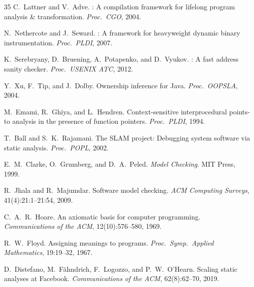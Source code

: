 \documentclass[11pt,a4paper]{article}
\begin{document}
\begin{thebibliography}{35}
C.~Lattner and V.~Adve.
: A compilation framework for lifelong program analysis \& transformation.
\newblock \emph{Proc.\ CGO}, 2004.

N.~Nethercote and J.~Seward.
: A framework for heavyweight dynamic binary instrumentation.
\newblock \emph{Proc.\ PLDI}, 2007.

K.~Serebryany, D.~Bruening, A.~Potapenko, and D.~Vyukov.
: A fast address sanity checker.
\newblock \emph{Proc.\ USENIX ATC}, 2012.

Y.~Xu, F.~Tip, and J.~Dolby.
\newblock Ownership inference for {Java}.
\newblock \emph{Proc.\ OOPSLA}, 2004.

M.~Emami, R.~Ghiya, and L.~Hendren.
\newblock Context-sensitive interprocedural points-to analysis in the presence of function pointers.
\newblock \emph{Proc.\ PLDI}, 1994.

T.~Ball and S.~K.~Rajamani.
\newblock The {SLAM} project: Debugging system software via static analysis.
\newblock \emph{Proc.\ POPL}, 2002.

E.~M.~Clarke, O.~Grumberg, and D.~A.~Peled.
\newblock \emph{Model Checking}.
\newblock MIT Press, 1999.

R.~Jhala and R.~Majumdar.
\newblock Software model checking.
\newblock \emph{ACM Computing Surveys}, 41(4):21:1--21:54, 2009.

C.~A.~R.~Hoare.
\newblock An axiomatic basis for computer programming.
\newblock \emph{Communications of the ACM}, 12(10):576--580, 1969.

R.~W.~Floyd.
\newblock Assigning meanings to programs.
\newblock \emph{Proc.\ Symp.\ Applied Mathematics}, 19:19--32, 1967.

D.~Distefano, M.~F\"ahndrich, F.~Logozzo, and P.~W.~O'Hearn.
\newblock Scaling static analyses at {Facebook}.
\newblock \emph{Communications of the ACM}, 62(8):62--70, 2019.

\end{thebibliography}
\end{document}
